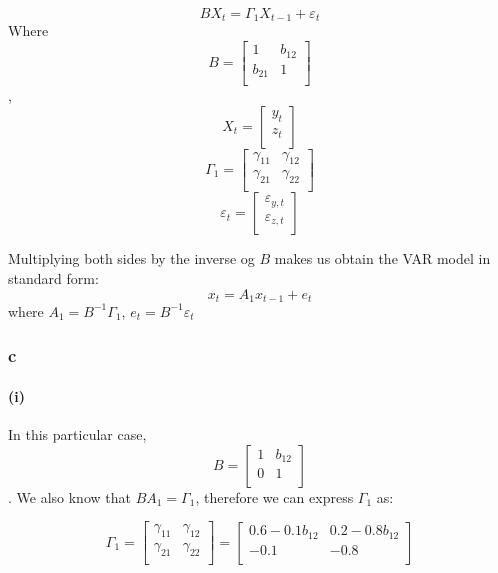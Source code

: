 \documentclass[]{article}
\let\oldparagraph\paragraph
\renewcommand{\paragraph}[1]{\oldparagraph{#1}\mbox{}}
\begin{document}
\[BX_t=\Gamma_1X_{t-1} + \varepsilon_t\] Where \[
   B=
  \left[ {\begin{array}{cc}
   1 & b_{12} \\
   b_{21} & 1 \\
  \end{array} } \right]
\] , \[
   X_t=
  \left[ {\begin{array}{cc}
   y_t  \\
   z_t \\
  \end{array} } \right]
\] \[
   \Gamma_1=
  \left[ {\begin{array}{cc}
   \gamma_{11} & \gamma_{12} \\
   \gamma_{21} & \gamma_{22} \\
  \end{array} } \right]
\] \[
   \varepsilon_t=
  \left[ {\begin{array}{cc}
   \varepsilon_{y,t}  \\
   \varepsilon_{z,t} \\
  \end{array} } \right]
\]

Multiplying both sides by the inverse og \(B\) makes us obtain the VAR
model in standard form: \[x_t = A_1x_{t-1}+e_t\] where
\(A_1 =B^{-1}\Gamma_1\), \(e_t = B^{-1}\varepsilon_t\)

\subsubsection{c}\label{c}

\paragraph{(i)}\label{i}

In this particular case, \[
   B=
  \left[ {\begin{array}{cc}
   1 & b_{12} \\
   0 & 1 \\
  \end{array} } \right]
\]. We also know that \(BA_1 =\Gamma_1\), therefore we can express
\(\Gamma_1\) as:

\[\Gamma_1=
  \left[ {\begin{array}{cc}
   \gamma_{11} & \gamma_{12} \\
   \gamma_{21} & \gamma_{22} \\
  \end{array} } \right]=
    \left[ {\begin{array}{cc}
   0.6-0.1b_{12} & 0.2-0.8b_{12} \\
   -0.1 & -0.8 \\
  \end{array} } \right]
  \]
\end{document}

